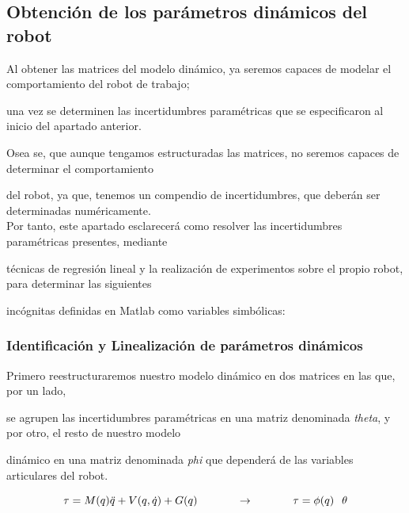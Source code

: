 \subsection{Obtención de los parámetros dinámicos del robot}

Al obtener las matrices del modelo dinámico, ya seremos capaces de modelar el comportamiento del robot de trabajo;

una vez se determinen las incertidumbres paramétricas que se especificaron al inicio del apartado anterior.

Osea se, que aunque tengamos estructuradas las matrices, no seremos capaces de determinar el comportamiento

del robot, ya que, tenemos un compendio de incertidumbres, que deberán ser determinadas numéricamente.\\



Por tanto, este apartado esclarecerá como resolver las incertidumbres paramétricas presentes, mediante

técnicas de regresión lineal y la realización de experimentos sobre el propio robot, para determinar las siguientes

incógnitas definidas en Matlab como variables simbólicas:



\subsubsection{Identificación y Linealización de parámetros dinámicos}

Primero reestructuraremos nuestro modelo dinámico en dos matrices en las que, por un lado,

se agrupen las incertidumbres paramétricas en una matriz denominada \textit{theta}, y por otro, el resto de nuestro modelo

dinámico en una matriz denominada \textit{phi} que dependerá de las variables articulares del robot.



\begin{equation}
\tau=M(q)\ddot{q}+V(q,\dot{q})+G(q) \hspace{1.25cm}  \rightarrow \hspace{1.25cm} \tau=\phi(q) \hspace{0.25cm} \theta
\end{equation}





